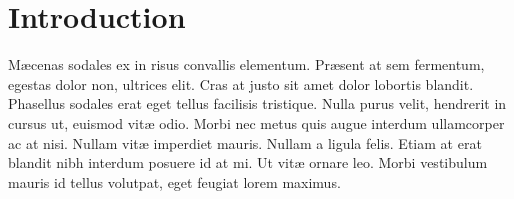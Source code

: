 %
%
%
%
%
%

%
%
%


\begin{comment}
  \category{D.2.2}{Software Engineering}{Design Tools and Techniques}
  \category{D.2.4}{Software Engineering}{Software/Program Verification}
  \category{H.3.5}{In\-for\-ma\-tion Storage and Retrieval}{Online Information Services}[web-based services]
  \terms{Theory, verification}
  \keywords{Navigation, web applications, model checking}
  \vfill\eject
\end{comment}

\section{Introduction} %

M\ae{}cenas sodales ex in risus convallis elementum. Pr\ae{}sent at sem fermentum, egestas dolor non, ultrices elit. Cras at justo sit amet dolor lobortis blandit. Phasellus sodales erat eget tellus facilisis tristique. Nulla purus velit, hendrerit in cursus ut, euismod vit\ae{} odio. Morbi nec metus quis augue interdum ullamcorper ac at nisi. Nullam vit\ae{} imperdiet mauris. Nullam a ligula felis. Etiam at erat blandit nibh interdum posuere id at mi. Ut vit\ae{} ornare leo. Morbi vestibulum mauris id tellus volutpat, eget feugiat lorem maximus.

